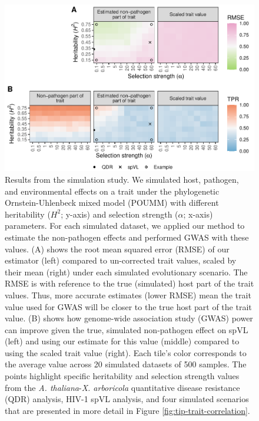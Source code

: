 \documentclass[11pt]{article}
\begin{document}
\begin{linenumbers}
\begin{figure}[H]
	\begin{center}
		\includegraphics[width=\linewidth]{fig2_Stadler_MBE-21-1179.pdf}
		\caption{Results from the simulation study. We simulated host, pathogen, and environmental effects on a trait under the phylogenetic Ornstein-Uhlenbeck mixed model (POUMM) with different heritability ($H^2$; y-axis) and selection strength ($\alpha$; x-axis) parameters. For each simulated dataset, we applied our method to estimate the non-pathogen effects and performed GWAS with these values. (A) shows the root mean squared error (RMSE) of our estimator (left) compared to un-corrected trait values, scaled by their mean (right) under each simulated evolutionary scenario. The RMSE is with reference to the true (simulated) host part of the trait values. Thus, more accurate estimates (lower RMSE) mean the trait value used for GWAS will be closer to the true host part of the trait value. (B) shows how genome-wide association study (GWAS) power can improve given the true, simulated non-pathogen effect on spVL (left) and using our estimate for this value (middle) compared to using the scaled trait value (right). Each tile's color corresponds to the average value across 20 simulated datasets of 500 samples. The points highlight specific heritability and selection strength values from the \emph{A. thaliana}-\emph{X. arboricola} quantitative disease resistance (QDR) analysis, HIV-1 spVL analysis, and four simulated scenarios that are presented in more detail in Figure \ref{fig:tip-trait-correlation}.}
		\label{fig:simulationResults}
	\end{center}
\end{figure}


\end{linenumbers}
\end{document}
